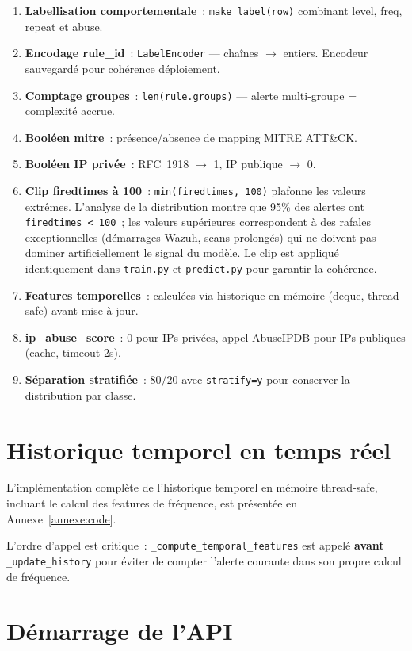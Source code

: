 \documentclass[12pt,a4paper]{report}
\begin{document}
\begin{enumerate}
  \item \textbf{Labellisation comportementale}~: \texttt{make\_label(row)} combinant level, freq, repeat et abuse.
  \item \textbf{Encodage rule\_id}~: \texttt{LabelEncoder} — chaînes $\rightarrow$ entiers. Encodeur sauvegardé pour cohérence déploiement.
  \item \textbf{Comptage groupes}~: \texttt{len(rule.groups)} — alerte multi-groupe = complexité accrue.
  \item \textbf{Booléen mitre}~: présence/absence de mapping MITRE ATT\&CK.
  \item \textbf{Booléen IP privée}~: RFC~1918 $\rightarrow$ 1, IP publique $\rightarrow$ 0.
  \item \textbf{Clip firedtimes à 100}~: \texttt{min(firedtimes, 100)} plafonne les valeurs extrêmes. L'analyse de la distribution montre que 95\% des alertes ont \texttt{firedtimes < 100}~; les valeurs supérieures correspondent à des rafales exceptionnelles (démarrages Wazuh, scans prolongés) qui ne doivent pas dominer artificiellement le signal du modèle. Le clip est appliqué identiquement dans \texttt{train.py} et \texttt{predict.py} pour garantir la cohérence.
  \item \textbf{Features temporelles}~: calculées via historique en mémoire (deque, thread-safe) avant mise à jour.
  \item \textbf{ip\_abuse\_score}~: 0 pour IPs privées, appel AbuseIPDB pour IPs publiques (cache, timeout 2s).
  \item \textbf{Séparation stratifiée}~: 80/20 avec \texttt{stratify=y} pour conserver la distribution par classe.
\end{enumerate}

\needspace{6cm}
\section{Historique temporel en temps réel}

L'implémentation complète de l'historique temporel en mémoire
thread-safe, incluant le calcul des features de fréquence, est
présentée en Annexe~\ref{annexe:code}.

L'ordre d'appel est critique~: \texttt{\_compute\_temporal\_features} est appelé \textbf{avant} \texttt{\_update\_history} pour éviter de compter l'alerte courante dans son propre calcul de fréquence.

\section{Démarrage de l'API}
\end{document}
